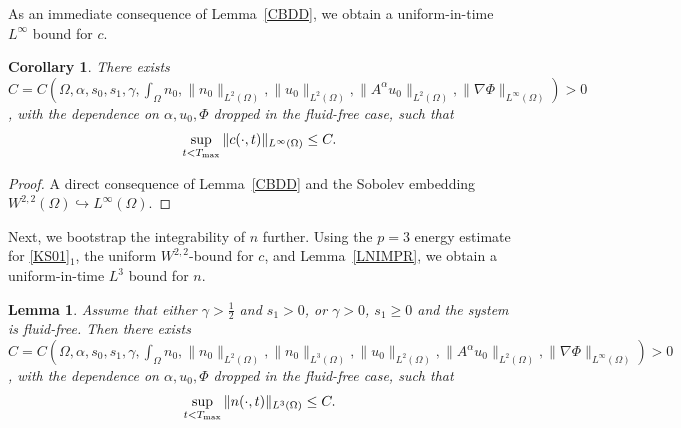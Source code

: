 \documentclass{amsart}
\newtheorem{lemma}[defn]{Lemma}
\newtheorem{cor}[defn]{Corollary}
\numberwithin{equation}{section}
\begin{document}
As an immediate consequence of Lemma~\ref{CBDD}, we obtain a uniform-in-time $L^\infty$ bound for $c$.

\begin{cor}\label{CBDDCOR}
There exists $C=C (\Omega,\alpha, s_0, s_1, \gamma, \int_\Omega n_0,\|n_0\|_{L^2(\Omega)}, \|u_0\|_{L^2(\Omega)},\|A^\alpha u_0\|_{L^2(\Omega)},\|\nabla\Phi\|_{L^\infty(\Omega)})>0$, with the dependence on $\alpha, u_0,\Phi$ dropped in the fluid-free case, such that
\[
\sup_{t<T_{\rm max}}   \|  c(\cdot,t)\|_{L^{\infty}(\Omega)}  \le C.
\]
\end{cor}

\begin{proof}
A direct consequence of Lemma~\ref{CBDD} and the Sobolev embedding $W^{2,2}(\Omega) \hookrightarrow L^{\infty}(\Omega)$.
\end{proof}

Next, we bootstrap the integrability of $n$ further.
Using the $p=3$ energy estimate for \eqref{KS01}$_1$, the uniform $W^{2,2}$-bound for $c$, and Lemma~\ref{LNIMPR}, we obtain a uniform-in-time $L^3$ bound for $n$.


\begin{lemma}\label{LEM14}
Assume that either $\gamma>\frac12$ and $s_1>0$, or $\gamma>0$, $s_1\ge0$ and the system is fluid-free.
Then there exists $C=C (\Omega,\alpha, s_0, s_1, \gamma, \int_\Omega n_0,\|n_0\|_{L^2(\Omega)}, \|n_0\|_{L^3(\Omega)}, \|u_0\|_{L^2(\Omega)},\|A^\alpha u_0\|_{L^2(\Omega)},\|\nabla\Phi\|_{L^\infty(\Omega)})>0$, with the dependence on $\alpha, u_0,\Phi$ dropped in the fluid-free case, such that
\[
\sup_{t<T_{\rm max}} \| n(\cdot,t)\|_{L^{3}(\Omega)}   \le C.
  \]
\end{lemma}
\end{document}
